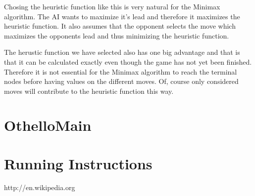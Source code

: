 \documentclass[a4paper]{article}
\begin{document}
Chosing the heuristic function like this is very natural for the Minimax algorithm. The AI wants to maximize it's lead and therefore it maximizes the heuristic function. It also assumes that the opponent selects the move which maximizes the opponents lead and thus minimizing the heuristic function.

The herustic function we have selected also has one big advantage and that is that it can be calculated exactly even though the game has not yet been finished. Therefore it is not essential for the Minimax algorithm to reach the terminal nodes before having values on the different moves. Of, course only considered moves will contribute to the heuristic function this way.



\section{OthelloMain}

\section{Running Instructions}


\begin{thebibliography}{1}
http://en.wikipedia.org
\end{thebibliography}
\end{document}
